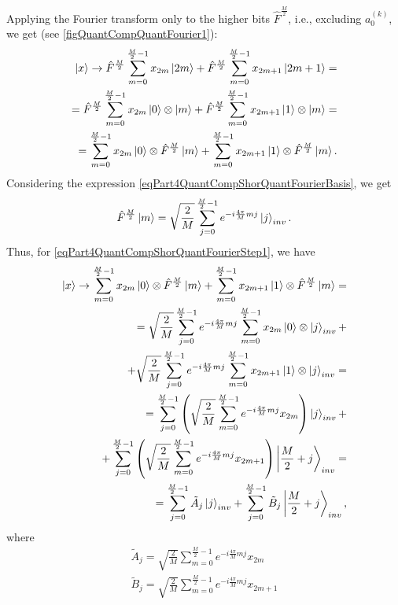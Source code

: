 Applying the Fourier transform only to the higher bits $\hat{F}^{\frac{M}{2}}$, i.e., excluding $a^{(k)}_0$, we get (see \autoref{figQuantCompQuantFourier1}):
\begin{eqnarray}
\ket{x} \rightarrow
\hat{F}^{\frac{M}{2}} \sum_{m = 0}^{\frac{M}{2} - 1}x_{2m} \ket{2m} +
\hat{F}^{\frac{M}{2}} \sum_{m = 0}^{\frac{M}{2} - 1}x_{2m + 1}
\ket{2m+1} = 
\nonumber \\
=
\hat{F}^{\frac{M}{2}} \sum_{m = 0}^{\frac{M}{2} - 1}x_{2m} 
\ket{0} \otimes  \ket{m} +
\hat{F}^{\frac{M}{2}} \sum_{m = 0}^{\frac{M}{2} - 1}x_{2m + 1}
\ket{1} \otimes  \ket{m}
=
\nonumber \\
=
\sum_{m = 0}^{\frac{M}{2} - 1}x_{2m} 
\ket{0} \otimes \hat{F}^{\frac{M}{2}} \ket{m} +
\sum_{m = 0}^{\frac{M}{2} - 1}x_{2m + 1}
\ket{1} \otimes \hat{F}^{\frac{M}{2}} \ket{m}.
\label{eqPart4QuantCompShorQuantFourierStep1}
\end{eqnarray}
Considering the expression \eqref{eqPart4QuantCompShorQuantFourierBasis}, we get
\begin{equation}
\hat{F}^{\frac{M}{2}} \ket{m} = \sqrt{\frac{2}{M}}
\sum_{j= 0}^{\frac{M}{2} - 1} e^{-i \frac{4 \pi}{M} m j}\ket{j}_{inv}.
\nonumber
\end{equation}
Thus, for \eqref{eqPart4QuantCompShorQuantFourierStep1}, we have
\begin{eqnarray}
\ket{x} \rightarrow
\sum_{m = 0}^{\frac{M}{2} - 1}x_{2m} 
\ket{0} \otimes \hat{F}^{\frac{M}{2}} \ket{m} +
\sum_{m = 0}^{\frac{M}{2} - 1}x_{2m + 1}
\ket{1} \otimes \hat{F}^{\frac{M}{2}} \ket{m} = 
\nonumber \\
=
\sqrt{\frac{2}{M}} \sum_{j = 0}^{\frac{M}{2} - 1} e^{-i \frac{4 \pi}{M} m j} 
\sum_{m = 0}^{\frac{M}{2} - 1}x_{2m} \ket{0} \otimes
\ket{j}_{inv}
+
\nonumber \\
+
\sqrt{\frac{2}{M}} \sum_{j = 0}^{\frac{M}{2} - 1} e^{-i \frac{4 \pi}{M} m j} 
\sum_{m = 0}^{\frac{M}{2} - 1}x_{2m+1} \ket{1} \otimes
\ket{j}_{inv}
=
\nonumber \\
=
\sum_{j = 0}^{\frac{M}{2} - 1}  
\left( \sqrt{\frac{2}{M}} 
\sum_{m = 0}^{\frac{M}{2} - 1} e^{-i \frac{4 \pi}{M} m j} x_{2m} 
\right) \ket{j}_{inv}
+
\nonumber \\
+
\sum_{j = 0}^{\frac{M}{2} - 1}
\left( \sqrt{\frac{2}{M}}  
\sum_{m = 0}^{\frac{M}{2} - 1}e^{-i \frac{4 \pi}{M} m j} x_{2m+1} 
\right)
\left|\frac{M}{2} + j\right>_{inv}
=
\nonumber \\
= \sum^{\frac{M}{2} - 1}_{j = 0}  \tilde{A}_{j} \ket{j}_{inv} +
\sum^{\frac{M}{2} - 1}_{j = 0}  \tilde{B}_{j} \left|\frac{M}{2} + j\right>_{inv},
\nonumber
\end{eqnarray}
where
\begin{eqnarray}
\tilde{A}_{j} = 
\sqrt{\frac{2}{M}} 
\sum_{m = 0}^{\frac{M}{2} - 1} e^{-i \frac{4 \pi}{M} m j} x_{2m} 
\nonumber \\
\tilde{B}_{j} =
\sqrt{\frac{2}{M}} 
\sum_{m = 0}^{\frac{M}{2} - 1} e^{-i \frac{4 \pi}{M} m j} x_{2m+1} 
\label{eqPart4QuantCompShorAB}
\end{eqnarray}

